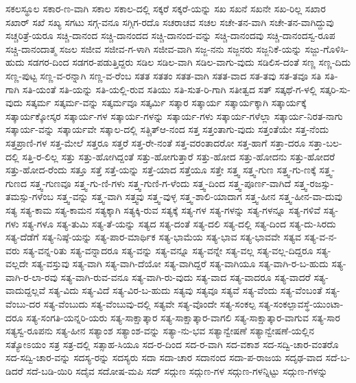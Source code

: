 ಸಕಲಸ್ಥೂಲ
ಸಕಾರ-ಣ-ವಾಗಿ
ಸಕಾಲ
ಸಕಾಲ-ದಲ್ಲಿ
ಸಕ್ಕರೆ
ಸಕ್ಕರೆ-ಯನ್ನು
ಸಖ
ಸಖನೆ
ಸಖನೇ
ಸಖ-ರಿಲ್ಲ
ಸಖಾರ
ಸಖಾರ್
ಸಖೆ
ಸಖ್ಯ
ಸಗಟು
ಸಗ್ಗ-ವನೂ
ಸಗ್ಗಿಗ-ರದೊ
ಸಚರಾಚವ
ಸಚಲ
ಸಚೇ-ತನ-ವಾಗಿ
ಸಚೇ-ತನ-ವಾಗಿದ್ದುವು
ಸಚ್ಚರಿತ್ರೆ-ಯರೂ
ಸಚ್ಚಿ-ದಾನಂದ
ಸಚ್ಚಿ-ದಾನಂದದ
ಸಚ್ಚಿ-ದಾನಂದ-ವನ್ನು
ಸಚ್ಚಿ-ದಾನಂದವು
ಸಚ್ಚಿ-ದಾನಂದಸ್ವ-ರೂಪ
ಸಚ್ಚಿ-ದಾನಂದಾತ್ಮ
ಸಜಲ
ಸಜೀವ
ಸಜೀವ-ಗ-ಳಾಗಿ
ಸಜೀವ-ವಾಗಿ
ಸಜ್ಜ-ನನು
ಸಜ್ಜನರು
ಸಜ್ಜನಿಕೆ-ಯನ್ನು
ಸಜ್ಜು-ಗೊಳಿಸಿ-ಹುದು
ಸಡಗರ-ದಿಂದ
ಸಡಗರ-ಪಡುತ್ತಿದ್ದರು
ಸಡಿಲ
ಸಡಿಲ-ವಾಗಿ
ಸಡಿಲ-ವಾಗು-ವುದು
ಸಡಿಲಿಸ-ದಂತೆ
ಸಣ್ಣ
ಸಣ್ಣ-ದಿದು
ಸಣ್ಣ-ಪುಟ್ಟ
ಸಣ್ಣ-ವ-ರನ್ನಾಗಿ
ಸಣ್ಣ-ವ-ರೆಂಬ
ಸತತ
ಸತತಂ
ಸತತ-ವಾಗಿ
ಸತತ-ವಾದ
ಸತ-ತವು
ಸತ-ತವೂ
ಸತಿ
ಸತಿ-ಗಾಗಿ
ಸತಿ-ಯಂತೆ
ಸತಿ-ಯನ್ನು
ಸತಿ-ಯಲ್ಲಿ-ರುವ
ಸತಿಯು
ಸತಿ-ಸುತ-ರಿ-ಗಾಗಿ
ಸತೀತ್ವದ
ಸತ್
ಸತ್ಕಥೆ-ಗ-ಳಲ್ಲಿ
ಸತ್ಕರಿ-ಸು-ವುದು
ಸತ್ಕರ್ಮ
ಸತ್ಕರ್ಮ-ವನ್ನು
ಸತ್ಕರ್ಮವೂ
ಸತ್ಕರ್ಮಿ
ಸತ್ಕಾರ
ಸತ್ಕಾರ್ಯ
ಸತ್ಕಾರ್ಯಕ್ಕಾಗಿ
ಸತ್ಕಾರ್ಯಕ್ಕೆ
ಸತ್ಕಾರ್ಯಕ್ಕೋಸ್ಕರ
ಸತ್ಕಾರ್ಯ-ಗಳ
ಸತ್ಕಾರ್ಯ-ಗಳನ್ನು
ಸತ್ಕಾರ್ಯ-ಗಳು
ಸತ್ಕಾರ್ಯ-ಗಳೆಲ್ಲಾ
ಸತ್ಕಾರ್ಯ-ನಿರತ-ನಾಗು
ಸತ್ಕಾರ್ಯ-ವನ್ನು
ಸತ್ಕಾರ್ಯವೇ
ಸತ್ಕಾಲ-ದಲ್ಲಿ
ಸತ್ಚಿತ್ಆ-ನಂದ
ಸತ್ತ
ಸತ್ತಂತಾಗು-ವುದು
ಸತ್ತಂತೆಯೇ
ಸತ್ತ-ನೆಂದು
ಸತ್ತಪ್ರಾಣಿ-ಗಳ
ಸತ್ತ-ಮೇಲೆ
ಸತ್ತರೂ
ಸತ್ತರೆ
ಸತ್ತ-ರೇ-ನಂತೆ
ಸತ್ತ-ವರಂತಾದರೋ
ಸತ್ತ-ಹಾಗೆ
ಸತ್ತಾ-ದರೂ
ಸತ್ತಾ-ಬಲ-ದಲ್ಲಿ
ಸತ್ತಿ-ರ-ಲಿಲ್ಲ
ಸತ್ತು
ಸತ್ತು-ಹೋಗಿದ್ದಂತೆ
ಸತ್ತು-ಹೋಗುತ್ತಾರೆ
ಸತ್ತು-ಹೋದ
ಸತ್ತು-ಹೋದನು
ಸತ್ತು-ಹೋದರೆ
ಸತ್ತು-ಹೋದ-ರೆಂದು
ಸತ್ತೂ
ಸತ್ತೆ
ಸತ್ತೆ-ಯನ್ನು
ಸತ್ತೆ-ಯಾದ
ಸತ್ತೆಯೂ
ಸತ್ತೇ
ಸತ್ತ್ವ
ಸತ್ತ್ವ-ಗುಣ
ಸತ್ತ್ವ-ಗು-ಣಕ್ಕೆ
ಸತ್ತ್ವ-ಗುಣದ
ಸತ್ತ್ವ-ಗುಣವೂ
ಸತ್ತ್ವ-ಗು-ಣಿ-ಗಳು
ಸತ್ತ್ವ-ಗುಣಿ-ಗ-ಳೆಂದು
ಸತ್ತ್ವ-ದಿಂದ
ಸತ್ತ್ವ-ಪೂರ್ಣ-ವಾಗಿದೆ
ಸತ್ತ್ವ-ರಜಸ್ಸು-ತಮಸ್ಸು-ಗಳೆಂಬ
ಸತ್ತ್ವ-ವನ್ನು
ಸತ್ತ್ವ-ವಾಗಿ
ಸತ್ತ್ವವು
ಸತ್ತ್ವ-ವುಳ್ಳ
ಸತ್ತ್ವ-ಶಾಲಿ-ಯಾದಾಗ
ಸತ್ತ್ವ-ಹೀನ
ಸತ್ತ್ವ-ಹೀನ-ವಾ-ದುವು
ಸತ್ಯ
ಸತ್ಯ-ಕಾಮ
ಸತ್ಯ-ಕಾಮನ
ಸತ್ಯಕ್ಕಾಗಿ
ಸತ್ಯಕ್ಕಿ-ರುವ
ಸತ್ಯಕ್ಕೆ
ಸತ್ಯ-ಗಳ
ಸತ್ಯ-ಗಳನ್ನು
ಸತ್ಯ-ಗಳನ್ನೂ
ಸತ್ಯ-ಗಳಿವೆ
ಸತ್ಯ-ಗಳು
ಸತ್ಯ-ಗಳೂ
ಸತ್ಯ-ತುಮಿ
ಸತ್ಯ-ತೆ-ಯನ್ನು
ಸತ್ಯದ
ಸತ್ಯ-ದಂತೆ
ಸತ್ಯ-ದಲಿ
ಸತ್ಯ-ದಲ್ಲಿ
ಸತ್ಯ-ದಿಂದ
ಸತ್ಯ-ದು-ಸಿರದು
ಸತ್ಯ-ದೆಡೆಗೆ
ಸತ್ಯ-ನಿಷ್ಠೆ-ಯನ್ನು
ಸತ್ಯ-ಪಾರ-ಮಾರ್ಥಿಕ
ಸತ್ಯ-ಭಾಮೆಯ
ಸತ್ಯ-ಭಾವ
ಸತ್ಯ-ಭಾವವೇ
ಸತ್ಯವ
ಸತ್ಯ-ವ-ನ-ವರು
ಸತ್ಯ-ವನ್ನ-ರಿತು
ಸತ್ಯ-ವನ್ನಾದರೂ
ಸತ್ಯ-ವನ್ನು
ಸತ್ಯ-ವನ್ನೂ
ಸತ್ಯ-ವನ್ನೇ
ಸತ್ಯ-ವಲ್ಲ
ಸತ್ಯ-ವಲ್ಲ-ದಿದ್ದರೂ
ಸತ್ಯ-ವಲ್ಲದೇ
ಸತ್ಯ-ವಸ್ತುವು
ಸತ್ಯ-ವಾಗಿ
ಸತ್ಯ-ವಾಗಿ-ದೆಯೋ
ಸತ್ಯ-ವಾಗಿದ್ದರೆ
ಸತ್ಯ-ವಾಗಿಯೂ
ಸತ್ಯ-ವಾಗಿ-ರ-ಬ-ಹುದು
ಸತ್ಯ-ವಾಗಿ-ರ-ಲಾ-ರವು
ಸತ್ಯ-ವಾಗಿ-ರುವ-ವನೂ
ಸತ್ಯ-ವಾಗಿ-ರು-ವುದು
ಸತ್ಯ-ವಾದ
ಸತ್ಯ-ವಾದರೂ
ಸತ್ಯ-ವಾದರೆ
ಸತ್ಯ-ವಾದುದ್ದಲ್ಲವೆ
ಸತ್ಯ-ವಿದು
ಸತ್ಯ-ವಿದೆ
ಸತ್ಯ-ವಿರ-ಬ-ಹುದು
ಸತ್ಯವು
ಸತ್ಯವೂ
ಸತ್ಯವೆ
ಸತ್ಯ-ವೆಂದು
ಸತ್ಯ-ವೆಂಬಂತೆ
ಸತ್ಯ-ವೆಂಬು-ದರ
ಸತ್ಯ-ವೆಂಬುದು
ಸತ್ಯ-ವೆಂಬುವು-ದಲ್ಲಿ
ಸತ್ಯವೇ
ಸತ್ಯ-ವೊಂದೇ
ಸತ್ಯ-ಸಂಕಲ್ಪ
ಸತ್ಯ-ಸಂಕಲ್ಪಾವಸ್ಥೆ-ಯುಂಟಾ-ದರೂ
ಸತ್ಯ-ಸಂಗತಿ-ಯನ್ನರಿ-ಯರು
ಸತ್ಯ-ಸಾಕ್ಷಾತ್ಕಾರ
ಸತ್ಯ-ಸಾಕ್ಷಾತ್ಕಾರ-ವಾಗಲಿ
ಸತ್ಯ-ಸಾಕ್ಷಾತ್ಕಾರ-ವಾಗುವ
ಸತ್ಯ-ಸಾರ
ಸತ್ಯಸ್ವ-ರೂಪನು
ಸತ್ಯ-ಹೀನ
ಸತ್ಯಾಂಶ
ಸತ್ಯಾಂಶ-ವನ್ನು
ಸತ್ಯಾ-ನು-ಭವ
ಸತ್ಯಾನ್ವೇಷಣೆ
ಸತ್ಯಾನ್ವೇಷಣೆ-ಯಲ್ಲಿನ
ಸತ್ಯೋಽಯಂ
ಸತ್ರ
ಸತ್ರ-ದಲ್ಲಿ
ಸತ್ಸಾಹ-ಸಿಯೂ
ಸದ-ರ-ದಿಂದ
ಸದ-ರ-ವಾಗಿ
ಸದ-ವಕಾಶ
ಸದ-ಸದ್ವಿ-ಚಾರ-ವಂತರೊ
ಸದ-ಸದ್ವಿ-ಚಾರ-ವನ್ನು
ಸದಸ್ಯ-ರನ್ನು
ಸದಸ್ಯರು
ಸದಾ
ಸದಾ-ಚಾರ
ಸದಾನಂದ
ಸದಾ-ಪ-ರಾಜಯ
ಸದೃಢ-ವಾದ
ಸದೆ-ಬ-ಡಿದರೆ
ಸದೆ-ಬಡಿ-ಯಿರಿ
ಸದೈವ
ಸದೋಷ-ಮಪಿ
ಸದ್
ಸದ್ಗುಣ
ಸದ್ಗುಣ-ಗಳ
ಸದ್ಗುಣ-ಗಳನ್ನಿಟ್ಟು
ಸದ್ಗುಣ-ಗಳನ್ನು
